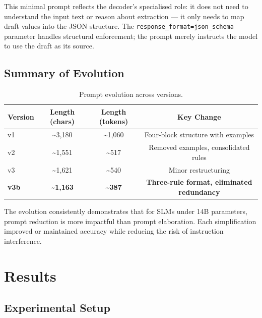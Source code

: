\documentclass{ceurart}
\begin{document}
This minimal prompt reflects the decoder's specialised role: it does not need to
understand the input text or reason about extraction --- it only needs to map draft
values into the JSON structure.
The \texttt{response\_format=json\_schema} parameter handles structural enforcement;
the prompt merely instructs the model to use the draft as its source.

\subsection{Summary of Evolution}

\begin{table}
  \caption{Prompt evolution across versions.}
  \label{tab:prompt-evolution}
  \centering
  \begin{tabular}{lccc}
    \toprule
    Version & Length (chars) & Length (tokens) & Key Change \\
    \midrule
    v1  & {\textasciitilde}3,180 & {\textasciitilde}1,060 & Four-block structure with examples \\
    v2  & {\textasciitilde}1,551 & {\textasciitilde}517   & Removed examples, consolidated rules \\
    v3  & {\textasciitilde}1,621 & {\textasciitilde}540   & Minor restructuring \\
    \textbf{v3b} & \textbf{{\textasciitilde}1,163} & \textbf{{\textasciitilde}387} & \textbf{Three-rule format, eliminated redundancy} \\
    \bottomrule
  \end{tabular}
\end{table}

The evolution consistently demonstrates that for SLMs under 14B parameters, prompt
reduction is more impactful than prompt elaboration.
Each simplification improved or maintained accuracy while reducing the risk of
instruction interference.

\section{Results}
\label{sec:results}

\subsection{Experimental Setup}
\end{document}
